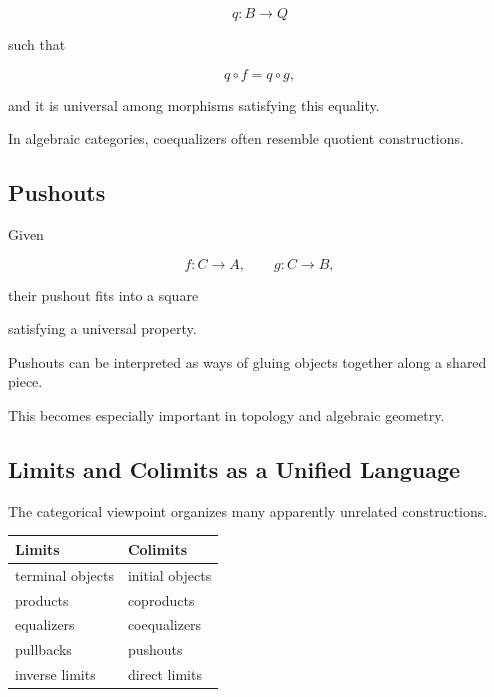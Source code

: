 \[ q:B\to Q \]

such that

\[ q\circ f=q\circ g, \]

and it is universal among morphisms satisfying this equality.

\begin{center}
\end{center}

In algebraic categories, coequalizers often resemble quotient constructions.

\subsection{Pushouts}
\label{subsec:pushouts}

Given

\[ f:C\to A,\qquad g:C\to B, \]

their pushout fits into a square

\begin{center}
\end{center}

satisfying a universal property.

Pushouts can be interpreted as ways of gluing objects together along a
shared piece.

This becomes especially important in topology and algebraic geometry.

\subsection{Limits and Colimits as a Unified Language}
\label{subsec:limits-colimits-unified}

The categorical viewpoint organizes many apparently unrelated constructions.

\begin{center}
\begin{tabularx}{0.92\textwidth}{@{}XX@{}}
\toprule
\textbf{Limits} & \textbf{Colimits}\\
\midrule
terminal objects & initial objects\\
products & coproducts\\
equalizers & coequalizers\\
pullbacks & pushouts\\
inverse limits & direct limits\\
\bottomrule
\end{tabularx}
\end{center}

